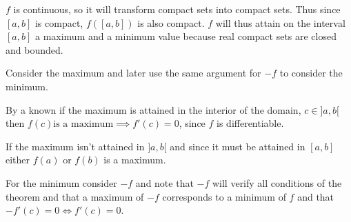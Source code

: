 \documentclass[12pt]{article}
\begin{document}
$f$ is continuous, so it will transform compact sets into compact sets.
Thus since $[a,b]$ is compact, $f([a,b])$ is also compact.
$f$ will thus attain on the interval $[a,b]$ a maximum and a minimum value because real compact sets are closed and bounded.

Consider the maximum and later use the same argument for $-f$ to consider the minimum.

By a known  if the maximum is attained in the interior of the domain, $c \in ]a,b[$ then $f(c) \text{is a maximum} \implies f'(c)=0$, since $f$ is differentiable.

If the maximum isn't attained in $]a,b[$ and since it must be attained in $[a,b]$ either $f(a)$ or $f(b)$ is a maximum.

For the minimum consider $-f$ and note that $-f$ will verify all conditions of the theorem and that a maximum of $-f$ corresponds to a minimum of $f$ and that
$-f'(c)=0 \iff f'(c)=0$.
\end{document}
